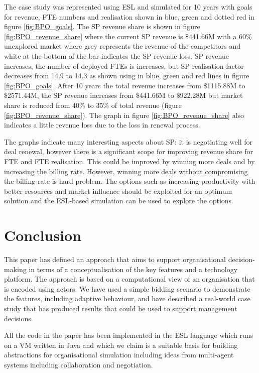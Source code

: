 \documentclass[10pt,numbers]{sigplanconf}
\begin{document}
The case study was represented using ESL and simulated for 10 years with goals for revenue, FTE numbers and realisation shown in blue, green and dotted red in figure \ref{fig:BPO_goals}. The SP revenue share is 
shown in figure \ref{fig:BPO_revenue_share} where the current SP revenue is \$441.66M  with a 60\% unexplored market where grey represents the revenue of the competitors and white at the bottom of the bar indicates the SP 
revenue loss. SP revenue increases, the number of deployed FTEs is increases, but SP realisation factor decreases from 14.9 to 14.3  as shown using in blue, green and red lines in figure \ref{fig:BPO_goals}. After 10 years the 
total revenue increases from \$1115.88M to \$2571.44M, the SP revenue increases from \$441.66M to \$922.28M but market share is reduced from 40\% to 35\% of total revenue (figure \ref{fig:BPO_revenue_share}). The graph in figure \ref{fig:BPO_revenue_share} also indicates a little revenue loss due to the loss in renewal process.

The graphs indicate many interesting aspects about SP: it is negotiating well for deal renewal, however there is a significant scope for improving revenue share for FTE and FTE realisation. This could be improved by winning more deals and by increasing the billing rate. However, winning more deals without compromising the billing rate is hard problem. The options such as increasing productivity with better resources and market influence should be exploited for an optimum solution and the ESL-based simulation can be used to explore the options.


\section{Conclusion}

\label{sec:conclusion}

This paper has defined an approach that aims to support organisational decision-making in terms of a conceptualisation of the key features and a technology platform. The approach is based on a computational view of an organisation that is encoded using actors. We have used a simple bidding scenario to demonstrate the features, including adaptive behaviour, and have described a real-world case study that has produced results that could be used to support management decisions. 

All the code in the paper has been implemented in the ESL language which runs on a VM written in Java and which we claim is a suitable basis for building abstractions for organisational simulation including ideas from multi-agent systems including collaboration and negotiation. 
\end{document}
